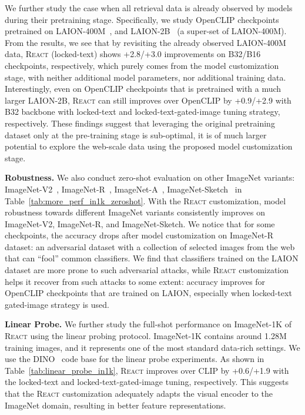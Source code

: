 \documentclass[10pt,twocolumn,letterpaper]{article}
\renewcommand{\paragraph}[1]{\vspace{1.25mm}\noindent\textbf{#1}}
\newcommand{\shortname}{\textsc{React}}
\begin{document}
We further study the case when all retrieval data is already observed by models during their pretraining stage.  Specifically, we study OpenCLIP checkpoints pretrained on LAION-400M~\cite{schuhmann2021laion}, and LAION-2B~\cite{schuhmann2022laion} (a super-set of LAION-400M).
From the results, we see that by revisiting the already observed LAION-400M data, \shortname{} (locked-text) shows +2.8/+3.0 improvements on B32/B16 checkpoints, respectively, which purely comes from the model customization stage, with neither additional model parameters, nor additional training data.  Interestingly, even on OpenCLIP checkpoints that is pretrained with a much larger LAION-2B, \shortname{} can still improves over OpenCLIP by +0.9/+2.9 with B32 backbone with locked-text and locked-text-gated-image tuning strategy, respectively.
These findings suggest that leveraging the original pretraining dataset only at the pre-training stage is sub-optimal, it is of much larger potential to explore the web-scale data using the proposed model customization stage. 

\paragraph{Robustness.}
We also conduct zero-shot evaluation on other ImageNet variants: ImageNet-V2~\cite{kornblith2019better}, ImageNet-R~\cite{hendrycks2021many}, ImageNet-A~\cite{hendrycks2021nae}, ImageNet-Sketch~\cite{wang2019learning} in Table~\ref{tab:more_perf_in1k_zeroshot}.
With the \shortname{} customization, model robustness towards different ImageNet variants consistently improves on ImageNet-V2, ImageNet-R, and ImageNet-Sketch.  We notice that for some checkpoints, the accuracy drops after model customization on ImageNet-R dataset: an adversarial dataset with a collection of selected images from the web that can ``fool'' common classifiers.  We find that classifiers trained on the LAION dataset are more prone to such adversarial attacks, while \shortname{} customization helps it recover from such attacks to some extent: accuracy improves for OpenCLIP checkpoints that are trained on LAION, especially when locked-text gated-image strategy is used.

\paragraph{Linear Probe.}
We further study the full-shot performance on ImageNet-1K of \shortname{} using the linear probing protocol.  ImageNet-1K contains around 1.28M training images, and it represents one of the most standard data-rich settings.  We use the DINO~\cite{caron2021emerging} code base for the linear probe experiments.  As shown in Table~\ref{tab:linear_probe_in1k}, \shortname{} improves over CLIP by +0.6/+1.9 with the locked-text and locked-text-gated-image tuning, respectively.  This suggests that the \shortname{} customization adequately adapts the visual encoder to the ImageNet domain, resulting in better feature representations.
\end{document}

